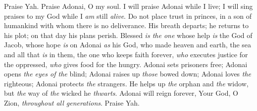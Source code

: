 \begin{biblechapter} %
 Praise Yah. 
Praise Adonai, O my soul.
\verse I will praise Adonai while I live; 
I will sing praises to my God while I \textit{am} still \textit{alive}.
\verse Do not place trust in princes, 
in a son of humankind with whom there is no deliverance.
\verse His breath departs; he returns to his plot; 
on that day his plans perish.
\verse Blessed \textit{is the one} whose help \textit{is} the God of Jacob, 
whose hope \textit{is} on Adonai \textit{as} his God,
\verse who made heaven and earth, 
the sea and all that \textit{is} in them, 
the one who keeps faith forever,
\verse \textit{who} executes justice for the oppressed, 
\textit{who} gives food for the hungry. 
Adonai sets prisoners free;
\verse Adonai opens \textit{the eyes of the} blind; 
Adonai raises up \textit{those} bowed down; 
Adonai loves \textit{the} righteous;
\verse Adonai protects \textit{the} strangers. 
He helps up \textit{the} orphan and \textit{the} widow, 
but \textit{the} way of \textit{the} wicked he \textit{thwarts}.
\verse Adonai will reign forever, 
Your God, O Zion, \textit{throughout all generations}. 
Praise Yah.
\end{biblechapter}

